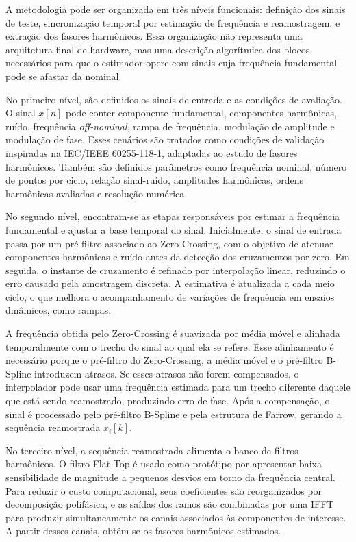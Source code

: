 A metodologia pode ser organizada em três níveis funcionais: definição dos sinais de teste, sincronização temporal por estimação de frequência e reamostragem, e extração dos fasores harmônicos. Essa organização não representa uma arquitetura final de hardware, mas uma descrição algorítmica dos blocos necessários para que o estimador opere com sinais cuja frequência fundamental pode se afastar da nominal.

No primeiro nível, são definidos os sinais de entrada e as condições de avaliação. O sinal $x[n]$ pode conter componente fundamental, componentes harmônicas, ruído, frequência \textit{off-nominal}, rampa de frequência, modulação de amplitude e modulação de fase. Esses cenários são tratados como condições de validação inspiradas na IEC/IEEE 60255-118-1, adaptadas ao estudo de fasores harmônicos. Também são definidos parâmetros como frequência nominal, número de pontos por ciclo, relação sinal-ruído, amplitudes harmônicas, ordens harmônicas avaliadas e resolução numérica.

No segundo nível, encontram-se as etapas responsáveis por estimar a frequência fundamental e ajustar a base temporal do sinal. Inicialmente, o sinal de entrada passa por um pré-filtro associado ao Zero-Crossing, com o objetivo de atenuar componentes harmônicas e ruído antes da detecção dos cruzamentos por zero. Em seguida, o instante de cruzamento é refinado por interpolação linear, reduzindo o erro causado pela amostragem discreta. A estimativa é atualizada a cada meio ciclo, o que melhora o acompanhamento de variações de frequência em ensaios dinâmicos, como rampas.

A frequência obtida pelo Zero-Crossing é suavizada por média móvel e alinhada temporalmente com o trecho do sinal ao qual ela se refere. Esse alinhamento é necessário porque o pré-filtro do Zero-Crossing, a média móvel e o pré-filtro B-Spline introduzem atrasos. Se esses atrasos não forem compensados, o interpolador pode usar uma frequência estimada para um trecho diferente daquele que está sendo reamostrado, produzindo erro de fase. Após a compensação, o sinal é processado pelo pré-filtro B-Spline e pela estrutura de Farrow, gerando a sequência reamostrada $x_i[k]$.

No terceiro nível, a sequência reamostrada alimenta o banco de filtros harmônicos. O filtro Flat-Top é usado como protótipo por apresentar baixa sensibilidade de magnitude a pequenos desvios em torno da frequência central. Para reduzir o custo computacional, seus coeficientes são reorganizados por decomposição polifásica, e as saídas dos ramos são combinadas por uma IFFT para produzir simultaneamente os canais associados às componentes de interesse. A partir desses canais, obtêm-se os fasores harmônicos estimados.


